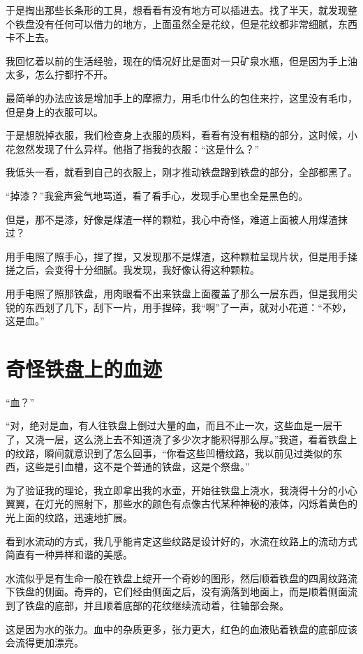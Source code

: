 于是掏出那些长条形的工具，想看看有没有地方可以插进去。找了半天，就发现整个铁盘没有任何可以借力的地方，上面虽然全是花纹，但是花纹都非常细腻，东西卡不上去。

我回忆着以前的生活经验，现在的情况好比是面对一只矿泉水瓶，但是因为手上油太多，怎么拧都拧不开。

最简单的办法应该是增加手上的摩擦力，用毛巾什么的包住来拧，这里没有毛巾，但是身上的衣服可以。

于是想脱掉衣服，我们检查身上衣服的质料，看看有没有粗糙的部分，这时候，小花忽然发现了什么异样。他指了指我的衣服：“这是什么？”

我低头一看，就看到自己的衣服上，刚才推动铁盘蹭到铁盘的部分，全部都黑了。

“掉漆？”我瓮声瓮气地骂道，看了看手心，发现手心里也全是黑色的。

但是，那不是漆，好像是煤渣一样的颗粒，我心中奇怪，难道上面被人用煤渣抹过？

用手电照了照手心，捏了捏，又发现那不是煤渣，这种颗粒呈现片状，但是用手揉搓之后，会变得十分细腻。我发现，我好像认得这种颗粒。

用手电照了照那铁盘，用肉眼看不出来铁盘上面覆盖了那么一层东西，但是我用尖锐的东西划了几下，刮下一片，用手捏碎，我“啊”了一声，就对小花道：“不妙，这是血。”

\chapter{奇怪铁盘上的血迹}

“血？”

“对，绝对是血，有人往铁盘上倒过大量的血，而且不止一次，这些血是一层干了，又浇一层，这么浇上去不知道浇了多少次才能积得那么厚。”我道，看着铁盘上的纹路，瞬间就意识到了怎么回事，“你看这些凹槽纹路，我以前见过类似的东西，这些是引血槽，这不是个普通的铁盘，这是个祭盘。”

为了验证我的理论，我立即拿出我的水壶，开始往铁盘上浇水，我浇得十分的小心翼翼，在灯光的照射下，那些水的颜色有点像古代某种神秘的液体，闪烁着黄色的光上面的纹路，迅速地扩展。

看到水流动的方式，我几乎能肯定这些纹路是设计好的，水流在纹路上的流动方式简直有一种异样和谐的美感。

水流似乎是有生命一般在铁盘上绽开一个奇妙的图形，然后顺着铁盘的四周纹路流下铁盘的侧面。奇异的，它们经由侧面之后，没有滴落到地面上，而是顺着侧面流到了铁盘的底部，并且顺着底部的花纹继续流动着，往轴部会聚。

这是因为水的张力。血中的杂质更多，张力更大，红色的血液贴着铁盘的底部应该会流得更加漂亮。

